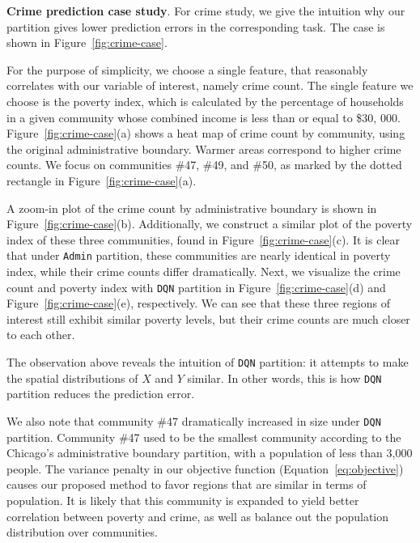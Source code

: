 \smallskip
\textbf{Crime prediction case study}. For crime study, we give the intuition why our partition gives lower prediction errors in the corresponding task. The case is shown in Figure~\ref{fig:crime-case}.

For the purpose of simplicity, we choose a single feature, that reasonably correlates with our variable of interest, namely crime count. The single feature we choose is the poverty index, which is calculated by the percentage of households in a given community whose combined income is less than or equal to \$30, 000. Figure~\ref{fig:crime-case}(a) shows a heat map of crime count by community, using the original administrative boundary. Warmer areas correspond to higher crime counts. We focus on communities \#47, \#49, and \#50, as marked by the dotted rectangle in Figure~\ref{fig:crime-case}(a). 


A zoom-in plot of the crime count by administrative boundary is shown in Figure~\ref{fig:crime-case}(b). Additionally, we construct a similar plot of the poverty index of these three communities, found in Figure~\ref{fig:crime-case}(c). It is clear that under  \texttt{Admin} partition, these communities are nearly identical in poverty index, while their crime counts differ dramatically. Next, we visualize the crime count and poverty index with  \texttt{DQN} partition in Figure~\ref{fig:crime-case}(d) and Figure~\ref{fig:crime-case}(e), respectively. We can see that these three regions of interest still exhibit similar poverty levels, but their crime counts are much closer to each other.


The observation above reveals the intuition of  \texttt{DQN} partition: it attempts to make the spatial distributions of $X$ and $Y$ similar. In other words, this is how  \texttt{DQN} partition reduces the prediction error.

We also note that community \#47 dramatically increased in size under  \texttt{DQN} partition. Community \#47 used to be the smallest community according to the Chicago's administrative boundary partition, with a population of less than 3,000 people. The variance penalty in our objective function (Equation~\ref{eq:objective}) causes our proposed method to favor regions that are similar in terms of population. It is likely that this community is expanded to yield better correlation between poverty and crime, as well as balance out the population distribution over communities.




